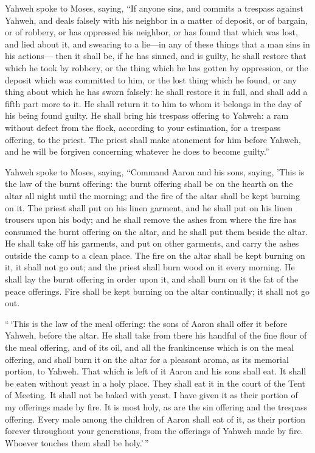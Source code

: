  Yahweh spoke to Moses, saying,  ``If anyone
sins, and commits a trespass against Yahweh, and deals falsely with his
neighbor in a matter of deposit, or of bargain, or of robbery, or has
oppressed his neighbor,  or has found that which was lost,
and lied about it, and swearing to a lie---in any of these things that a
man sins in his actions---  then it shall be, if he has
sinned, and is guilty, he shall restore that which he took by robbery,
or the thing which he has gotten by oppression, or the deposit which was
committed to him, or the lost thing which he found,  or
any thing about which he has sworn falsely: he shall restore it in full,
and shall add a fifth part more to it. He shall return it to him to whom
it belongs in the day of his being found guilty.  He shall
bring his trespass offering to Yahweh: a ram without defect from the
flock, according to your estimation, for a trespass offering, to the
priest.  The priest shall make atonement for him before
Yahweh, and he will be forgiven concerning whatever he does to become
guilty.''

 Yahweh spoke to Moses, saying,  ``Command
Aaron and his sons, saying, 'This is the law of the burnt offering: the
burnt offering shall be on the hearth on the altar all night until the
morning; and the fire of the altar shall be kept burning on it.
 The priest shall put on his linen garment, and he shall
put on his linen trousers upon his body; and he shall remove the ashes
from where the fire has consumed the burnt offering on the altar, and he
shall put them beside the altar.  He shall take off his
garments, and put on other garments, and carry the ashes outside the
camp to a clean place.  The fire on the altar shall be
kept burning on it, it shall not go out; and the priest shall burn wood
on it every morning. He shall lay the burnt offering in order upon it,
and shall burn on it the fat of the peace offerings. 
Fire shall be kept burning on the altar continually; it shall not go
out.

 ``\,`This is the law of the meal offering: the sons of
Aaron shall offer it before Yahweh, before the altar.  He
shall take from there his handful of the fine flour of the meal
offering, and of its oil, and all the frankincense which is on the meal
offering, and shall burn it on the altar for a pleasant aroma, as its
memorial portion, to Yahweh.  That which is left of it
Aaron and his sons shall eat. It shall be eaten without yeast in a holy
place. They shall eat it in the court of the Tent of Meeting.
 It shall not be baked with yeast. I have given it as
their portion of my offerings made by fire. It is most holy, as are the
sin offering and the trespass offering.  Every male among
the children of Aaron shall eat of it, as their portion forever
throughout your generations, from the offerings of Yahweh made by fire.
Whoever touches them shall be holy.'\,''

